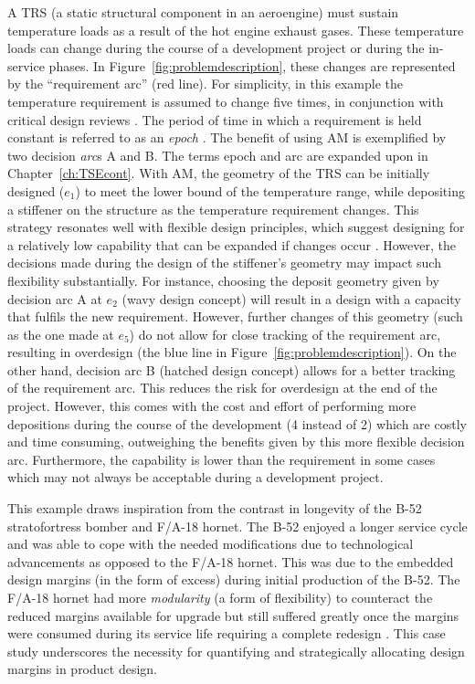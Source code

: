 A \acf{TRS} (a static structural component in an aeroengine) must sustain temperature loads as a result of the hot engine exhaust gases. These temperature loads can change during the course of a development project or during the in-service phases. In Figure~\ref{fig:problemdescription}, these changes are represented by the “requirement arc” (red line). For simplicity, in this example the temperature requirement is assumed to change five times, in conjunction with critical design reviews \cite{Cooper2008}. The period of time in which a requirement is held constant is referred to as an \textit{epoch} \cite{McManus2007}. The benefit of using \ac{AM} is exemplified by two decision \textit{arc}s A and B. The terms epoch and arc are expanded upon in Chapter~\ref{ch:TSEcont}. With \ac{AM}, the geometry of the \ac{TRS} can be initially designed ($e_1$) to meet the lower bound of the temperature range, while depositing a stiffener on the structure as the temperature requirement changes. This strategy resonates well with flexible design principles, which suggest designing for a relatively low capability that can be expanded if changes occur \cite{DeNeufville2011}. However, the decisions made during the design of the stiffener’s geometry may impact such flexibility substantially. For instance, choosing the deposit geometry given by decision arc A at $e_2$ (wavy design concept) will result in a design with a capacity that fulfils the new requirement. However, further changes of this geometry (such as the one made at $e_5$) do not allow for close tracking of the requirement arc, resulting in overdesign (the blue line in Figure~\ref{fig:problemdescription}). On the other hand, decision arc B (hatched design concept) allows for a better tracking of the requirement arc. This reduces the risk for overdesign at the end of the project. However, this comes with the cost and effort of performing more depositions during the course of the development (4 instead of 2) which are costly and time consuming, outweighing the benefits given by this more flexible decision arc. Furthermore, the capability is lower than the requirement in some cases which may not always be acceptable during a development project.

This example draws inspiration from the contrast in longevity of the B-52 stratofortress bomber and F/A-18 hornet. The B-52 enjoyed a longer service cycle and was able to cope with the needed modifications due to technological advancements as opposed to the F/A-18 hornet. This was due to the embedded design margins (in the form of excess) during initial production of the B-52. The F/A-18 hornet had more \textit{modularity} (a form of flexibility) to counteract the reduced margins available for upgrade but still suffered greatly once the margins were consumed during its service life requiring a complete redesign \cite{Long2017}. This case study underscores the necessity for quantifying and strategically allocating design margins in product design.

